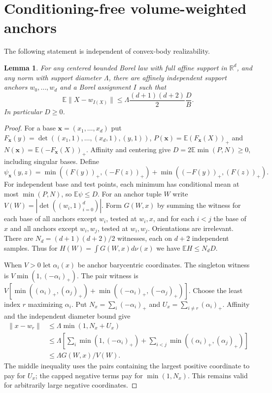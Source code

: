 \documentclass[11pt]{article}
\newtheorem{lemma}[theorem]{Lemma}
\newcommand{\E}{\mathbb E}
\newcommand{\R}{\mathbb R}
\begin{document}
\section{Conditioning-free volume-weighted anchors}
The following statement is independent of convex-body realizability.
\begin{lemma}\label{lem:anchors}
For any centered bounded Borel law with full affine support in $\R^d$, and
any norm with support diameter $\Lambda$, there are affinely independent
support anchors $w_0,\ldots,w_d$ and a Borel assignment $I$ such that
\[
\E\|X-w_{I(X)}\|\le\Lambda\frac{(d+1)(d+2)}2\frac DB.
\]
In particular $D\ge0$.
\end{lemma}
\begin{proof}
For a base $\mathbf x=(x_1,\ldots,x_d)$ put
$F_{\mathbf x}(y)=\det((x_1,1),\ldots,(x_d,1),(y,1))$,
$P(\mathbf x)=\E(F_{\mathbf x}(X))_+$ and
$N(\mathbf x)=\E(-F_{\mathbf x}(X))_+$. Affinity and centering give
$D=2\E\min(P,N)\ge0$, including singular bases. Define
\[
\psi_{\mathbf x}(y,z)=\min((F(y))_+,(-F(z))_+)
                       +\min((-F(y))_+,(F(z))_+).
\]
For independent base and test points, each minimum has conditional mean at
most $\min(P,N)$, so $\E\psi\le D$.
For an anchor tuple $W$ write $V(W)=|\det((w_i,1)_{i=0}^d)|$. Form $G(W,x)$
by summing the witness for each base of all anchors except $w_i$, tested at
$w_i,x$, and for each $i<j$ the base of $x$ and all anchors except $w_i,w_j$,
tested at $w_i,w_j$. Orientations are irrelevant. There are
$N_d=(d+1)(d+2)/2$ witnesses, each on $d+2$ independent samples. Thus for
$H(W)=\int G(W,x)d\nu(x)$ we have $\E H\le N_dD$.

When $V>0$ let $\alpha_i(x)$ be anchor barycentric coordinates. The singleton
witness is $V\min(1,(-\alpha_i)_+)$. The pair witness is
$V[\min((\alpha_i)_+,(\alpha_j)_+)+\min((-\alpha_i)_+,(-\alpha_j)_+)]$.
Choose the least index $r$ maximizing $\alpha_i$. Put
$N_x=\sum_i(-\alpha_i)_+$ and $U_x=\sum_{i\ne r}(\alpha_i)_+$.
Affinity and the independent diameter bound give
\[
\begin{aligned}
\|x-w_r\|&\le\Lambda\min(1,N_x+U_x)\\
&\le\Lambda\left[\sum_i\min(1,(-\alpha_i)_+)
                  +\sum_{i<j}\min((\alpha_i)_+,(\alpha_j)_+)\right]\\
&\le\Lambda G(W,x)/V(W).
\end{aligned}
\]
The middle inequality uses the pairs containing the largest positive
coordinate to pay for $U_x$; the capped negative terms pay for
$\min(1,N_x)$. This remains valid for arbitrarily large negative coordinates.


\end{proof}
\end{document}
